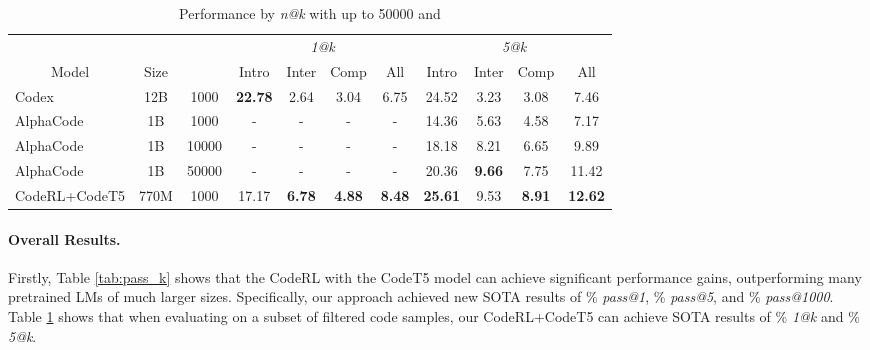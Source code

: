 \documentclass{article}
\begin{document}
\begin{table}[t]
\begin{subtable}[htbp]{1.0\textwidth}
\centering
\caption{Performance by \emph{n@k} with  up to 50000 and }
\label{tab:n_pass_k}
\resizebox{1.0\textwidth}{!} {
\begin{tabular}{lcc|cccc|cccc}
\hline
\multicolumn{1}{c}{}                        &                        &                     & \multicolumn{4}{c|}{\emph{1@k}}                                        & \multicolumn{4}{c}{\emph{5@k}}                                         \\
\cline{4-11}
\multicolumn{1}{c}{\multirow{-2}{*}{Model}} & \multirow{-2}{*}{Size} & \multirow{-2}{*}{} & Intro          & Inter         & Comp          & All           & Intro          & Inter         & Comp          & All            \\
\hline
Codex                                       & 12B                    & 1000                & \textbf{22.78} & 2.64          & 3.04          & 6.75          & 24.52          & 3.23          & 3.08          & 7.46           \\
AlphaCode                                   & 1B                     & 1000                & -              & -             & -             & -             & 14.36          & 5.63          & 4.58          & 7.17           \\
AlphaCode                                   & 1B                     & 10000               & -              & -             & -             & -             & 18.18          & 8.21          & 6.65          & 9.89           \\
AlphaCode                                   & 1B                     & 50000               & -              & -             & -             & -             & 20.36          & \textbf{9.66} & 7.75          & 11.42          \\
\hline


CodeRL+CodeT5                                 & 770M                   & 1000                & 17.17 &	\textbf{6.78} &	 \textbf{4.88}	 & \textbf{8.48}	 & \textbf{25.61}	 &9.53	 &\textbf{8.91}	 & \textbf{12.62}   \\


\hline
\end{tabular}
}
\end{subtable}
\end{table} 
\paragraph{Overall Results.}
Firstly, Table \ref{tab:pass_k} shows that the CodeRL with the CodeT5 model can achieve significant performance gains, outperforming many pretrained LMs of much larger sizes. 
Specifically, our approach achieved new SOTA results of \% \emph{pass@1}, \% \emph{pass@5}, and \% \emph{pass@1000}.
Table \ref{tab:n_pass_k} shows that 
when evaluating on a subset of filtered code samples, our CodeRL+CodeT5 can achieve SOTA results of \% \emph{1@k} and \% \emph{5@k}. 
\end{document}
